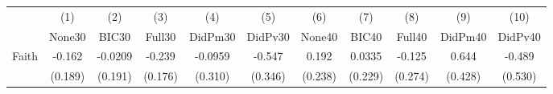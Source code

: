 {
\def\sym#1{\ifmmode^{#1}\else\(^{#1}\)\fi}
\begin{tabular}{l*{10}{c}}
\toprule
            &\multicolumn{1}{c}{(1)}&\multicolumn{1}{c}{(2)}&\multicolumn{1}{c}{(3)}&\multicolumn{1}{c}{(4)}&\multicolumn{1}{c}{(5)}&\multicolumn{1}{c}{(6)}&\multicolumn{1}{c}{(7)}&\multicolumn{1}{c}{(8)}&\multicolumn{1}{c}{(9)}&\multicolumn{1}{c}{(10)}\\
            &\multicolumn{1}{c}{None30}&\multicolumn{1}{c}{BIC30}&\multicolumn{1}{c}{Full30}&\multicolumn{1}{c}{DidPm30}&\multicolumn{1}{c}{DidPv30}&\multicolumn{1}{c}{None40}&\multicolumn{1}{c}{BIC40}&\multicolumn{1}{c}{Full40}&\multicolumn{1}{c}{DidPm40}&\multicolumn{1}{c}{DidPv40}\\
\midrule
Faith       &      -0.162         &     -0.0209         &      -0.239         &     -0.0959         &      -0.547         &       0.192         &      0.0335         &      -0.125         &       0.644         &      -0.489         \\
            &     (0.189)         &     (0.191)         &     (0.176)         &     (0.310)         &     (0.346)         &     (0.238)         &     (0.229)         &     (0.274)         &     (0.428)         &     (0.530)         \\
\bottomrule
\end{tabular}
}
